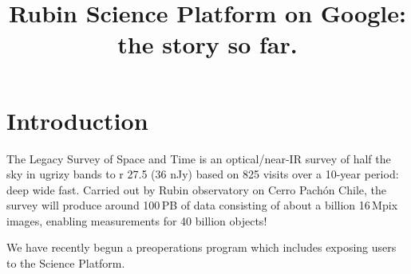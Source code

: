 \documentclass[11pt,twoside]{article}
\begin{document}
\title{Rubin Science Platform on Google: the story so far.}










\section{Introduction}

The Legacy Survey of Space and Time \citep{2019ApJ...873..111I} is an optical/near-IR survey of half the sky in ugrizy bands to r 27.5 (36 nJy) based on 825 visits over a 10-year period: deep wide fast.
Carried out by Rubin observatory on Cerro Pach\'{o}n Chile, the survey will produce around 100\,PB of data consisting of about a billion 16\,Mpix images, enabling measurements for 40 billion objects!

We have recently begun a preoperations program which includes exposing users to the Science Platform.
\end{document}
